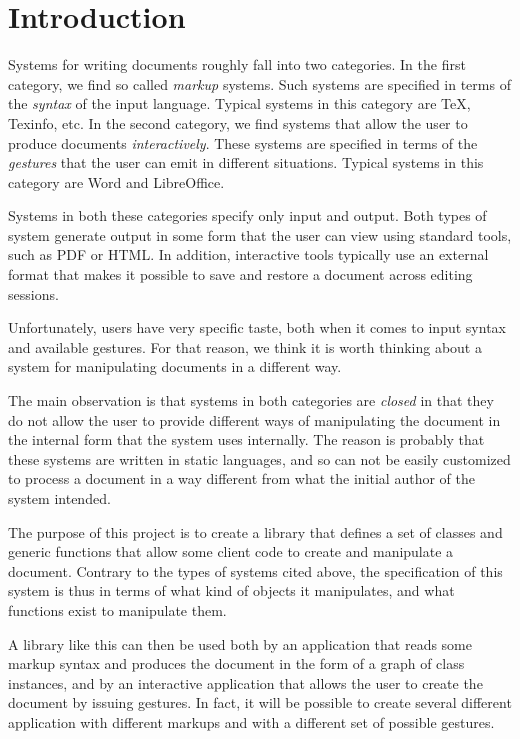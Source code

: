 \chapter{Introduction}
\setcounter{page}{1}%
%
\label{chap-introduction}%

Systems for writing documents roughly fall into two categories.  In
the first category, we find so called \emph{markup} systems.  Such
systems are specified in terms of the \emph{syntax} of the input
language.  Typical systems in this category are TeX, Texinfo, etc.  In
the second category, we find systems that allow the user to produce
documents \emph{interactively}.  These systems are specified in terms
of the \emph{gestures} that the user can emit in different situations.
Typical systems in this category are Word and LibreOffice.

Systems in both these categories specify only input and output.  Both
types of system generate output in some form that the user can view
using standard tools, such as PDF or HTML.  In addition, interactive
tools typically use an external format that makes it possible to save
and restore a document across editing sessions.

Unfortunately, users have very specific taste, both when it comes to
input syntax and available gestures.  For that reason, we think it is
worth thinking about a system for manipulating documents in a
different way.

The main observation is that systems in both categories are
\emph{closed} in that they do not allow the user to provide different
ways of manipulating the document in the internal form that the system
uses internally.  The reason is probably that these systems are
written in static languages, and so can not be easily customized to
process a document in a way different from what the initial author of
the system intended.

The purpose of this project is to create a library that defines a set
of classes and generic functions that allow some client code to create
and manipulate a document.  Contrary to the types of systems cited
above, the specification of this system is thus in terms of what kind
of objects it manipulates, and what functions exist to manipulate
them.

A library like this can then be used both by an application that reads
some markup syntax and produces the document in the form of a graph of
class instances, and by an interactive application that allows the
user to create the document by issuing gestures.  In fact, it will be
possible to create several different application with different
markups and with a different set of possible gestures.

